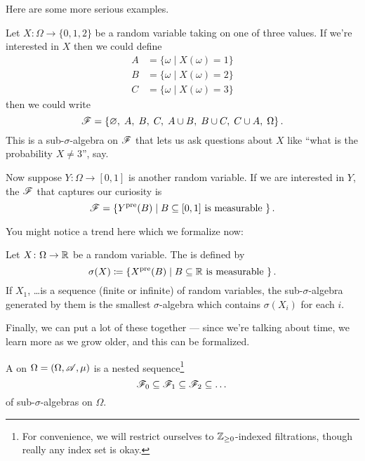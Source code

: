 Here are some more serious examples.
\begin{example}
	\listhack
	\begin{enumerate}[(a)]
		\ii Let $X \colon \Omega \to \{0,1,2\}$ be a random
		variable taking on one of three values.
		If we're interested in $X$ then we could define
		\begin{align*}
			A &= \{\omega \mid X(\omega) = 1\} \\
			B &= \{\omega \mid X(\omega) = 2\} \\
			C &= \{\omega \mid X(\omega) = 3\}
		\end{align*}
		then we could write
		\[ \mathscr F = \left\{ \varnothing, \; A, \; B, \; C, \;
				A \cup B, \; B \cup C, \; C \cup A, \; \Omega \right\}. \]
		This is a sub-$\sigma$-algebra on $\mathscr F$
		that lets us ask questions about $X$
		like ``what is the probability $X \neq 3$'', say.

		\ii Now suppose $Y \colon \Omega \to [0,1]$ is another random variable.
		If we are interested in $Y$,
		the $\mathscr F$ that captures our curiosity is
		\[ \mathscr F = \left\{ Y^{\text{pre}}(B) \mid B \subseteq [0,1]
			\text{ is measurable } \right\}. \]
	\end{enumerate}
\end{example}

You might notice a trend here which we formalize now:
\begin{definition}
	Let $X \colon \Omega \to \mathbb R$ be a random variable.
	The  is defined by
	\[ \sigma(X) \coloneqq \left\{ X^{\text{pre}}(B) \mid B \subseteq \mathbb R
		\text{ is measurable } \right\}. \]
	If $X_1$, \dots is a sequence (finite or infinite) of random variables,
	the sub-$\sigma$-algebra generated by them
	is the smallest $\sigma$-algebra which contains $\sigma(X_i)$ for each $i$.
\end{definition}

Finally, we can put a lot of these together ---
since we're talking about time, we learn more as we grow older,
and this can be formalized.
\begin{definition}
	A  on $\Omega = (\Omega, \mathscr A, \mu)$
	is a nested sequence\footnote{For convenience,
		we will restrict ourselves to $\mathbb Z_{\ge0}$-indexed
		filtrations, though really any index set is okay.}
	\[ \mathscr F_0 \subseteq \mathscr F_1 \subseteq \mathscr F_2 \subseteq \dots \]
	of sub-$\sigma$-algebras on $\Omega$.
\end{definition}

